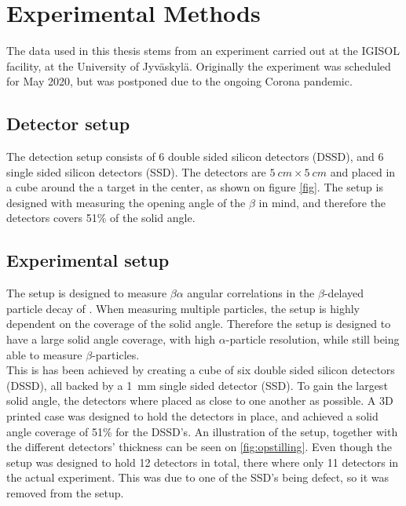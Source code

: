 \chapter{Experimental Methods}
The data used in this thesis stems from an experiment carried out at the IGISOL facility, at the University of Jyväskylä. Originally the experiment was scheduled for May 2020, but was postponed due to the ongoing Corona pandemic. 


\section{Detector setup}
The detection setup consists of 6 double sided silicon detectors (DSSD), and 6 single sided silicon detectors (SSD). 
The detectors are $\SI{5}{cm} \times \SI{5}{cm}$ and placed in a cube around the a target in the center, as shown on figure \cref{fig}. The setup is designed with measuring the opening angle of the $\beta$ in mind, and therefore the detectors covers 51\% of the solid angle. \\
 

\section{Experimental setup}
The setup is designed to measure $\beta\alpha$ angular correlations in the $\beta$-delayed particle decay of . When measuring multiple particles, the setup is highly dependent on the coverage of the solid angle. Therefore the setup is designed to have a large solid angle coverage, with high $\alpha$-particle resolution, while still being able to measure $\beta$-particles. \\
This is has been achieved by creating a cube of six double sided silicon detectors (DSSD), all backed by a \SI{1}{mm} single sided detector (SSD). To gain the largest solid angle, the detectors where placed as close to one another as possible. A 3D printed case was designed to hold the detectors in place, and achieved a solid angle coverage of 51\% for the DSSD's. An illustration of the setup, together with the different detectors' thickness can be seen on \cref{fig:opstilling}. 
Even though the setup was designed to hold 12 detectors in total, there where only 11 detectors in the actual experiment. This was due to one of the SSD's being defect, so it was removed from the setup. 


